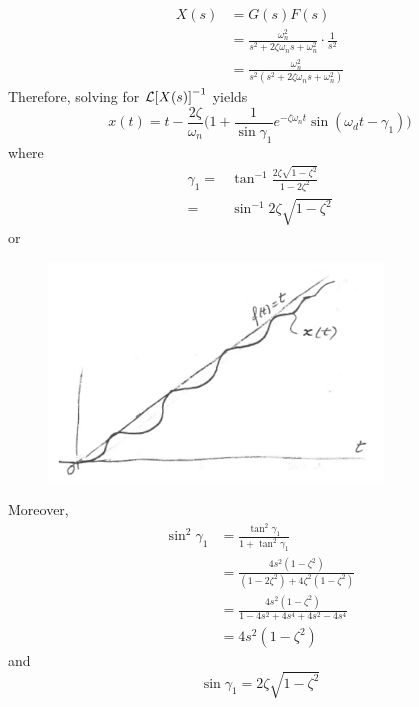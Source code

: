 \documentclass[12pt,letter]{article}
\begin{document}
\begin{align}
X(s) &= G(s)F(s) \\
&= \frac{\omega_n^2}{s^2 + 2 \zeta \omega_n s + \omega_n^2} \cdot \frac{1}{s^2}\nonumber \\
&=  \frac{\omega_n^2}{s^2(s^2 + 2 \zeta \omega_n s + \omega_n^2)}
\end{align}
Therefore, solving for $\mathcal{L}{\left[X(s)\right]}^{-1}$ yields
\begin{equation}
x(t) = t - \frac{2 \zeta}{\omega_n} \bigg( 1 + \frac{1}{\sin \gamma_1} e^{-\zeta \omega_n t}  \sin(\omega_dt - \gamma_1) \bigg)
\end{equation}
where
\begin{align}
\gamma_1 =& \tan^{-1} \frac{2 \zeta \sqrt{1-\zeta^2}}{1-2\zeta^2} \\
=& \sin^{-1} 2 \zeta \sqrt{1-\zeta^2}
\end{align}
or
\begin{figure}[H]
	\centering
	\includegraphics[width=3.5in]{../figures/x_t_ramp_time_response_2nd_order}
\end{figure}
Moreover, 
\begin{align}
\sin^2 \gamma_1 &= \frac{\tan^2 \gamma_1}{1 + \tan^2 \gamma_1}\\
 &= \frac{4 s^2 (1-\zeta^2)}{(1 - 2 \zeta^2)+ 4 \zeta^2(1-\zeta^2)} \nonumber \\
 &=  \frac{4 s^2 (1-\zeta^2)}{1-4s^2 + 4s^4 + 4s^2 - 4s^4} \nonumber \\
 &=  4 s^2 (1-\zeta^2) \nonumber
\end{align}
and
\begin{equation}
\sin \gamma_1 = 2 \zeta \sqrt{1-\zeta^2}
\end{equation}
\end{document}
